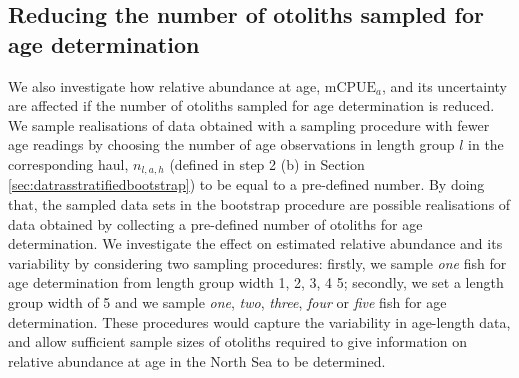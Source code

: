 \documentclass[a4paper 12pt]{article}
\numberwithin{equation}{section}
\begin{document}
\subsection{Reducing the number of otoliths sampled for age determination}
\label{sec:reducingeffort}
We also investigate how relative abundance at age, $\text{mCPUE}_a$, and its uncertainty are affected if the  number of otoliths sampled for age determination is reduced. We sample realisations of data obtained with a sampling procedure with fewer age readings by choosing the number of age observations in length group $l$ in the corresponding haul,  $n_{l,a,h}$ (defined in step 2 (b) in Section \ref{sec:datrasstratifiedbootstrap}) to be equal to a pre-defined number. By doing that, the sampled data sets in the bootstrap procedure are possible realisations of data obtained by collecting a pre-defined number of otoliths for age determination. We investigate the effect on estimated relative abundance and its variability by considering two sampling procedures: firstly,  we sample \textit{one} fish for age determination from length group width 1, 2, 3, 4 5; secondly, we set a length group width of 5 and we sample \textit{one}, \textit{two}, \textit{three}, \textit{four} or \textit{five} fish for age determination. These procedures would capture the variability in age-length data, and allow sufficient sample sizes of otoliths required to give information on relative abundance at age in the North Sea to be determined. 
\end{document}
